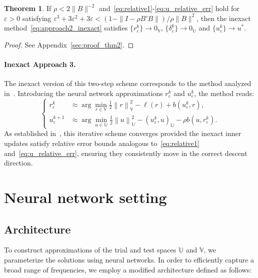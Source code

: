 \documentclass{article}
\theoremstyle{definition}
\newtheorem{theorem}{Theorem}
\begin{document}
\begin{theorem}\label{thm:approach2_inexact}
    If $\rho<2\|B\|^{-2}$ and~\eqref{eq:relative1}-\eqref{eq:u_relative_err} hold for $\varepsilon>0$ satisfying $\varepsilon^3+3\varepsilon^2+3\varepsilon< (1-\|I-\rho B'B\|)/\rho \|B\|^2$, then the inexact method~\eqref{eq:approach2_inexact} satisfies $\{r^k_\varepsilon\}\to 0_\mathbb{V}$, $\{\delta^k_\varepsilon\}\to 0_\mathbb{U}$ and $\{u^k_\varepsilon\}\to u^*$.
\end{theorem}
%
\begin{proof}
     See Appendix~\ref{sec:proof_thm2}. 
\end{proof}

\paragraph{Inexact Approach 3.}
The inexact version of this two-step scheme corresponds to the method analyzed in~\cite{BennyChackoBEV2025}. Introducing the neural network approximations $r^k_\varepsilon$ and $u^k_\varepsilon$, the method reads:
\begin{equation}\label{eq:approach3_inexact}
    \left\{
    \begin{aligned}
        r^{k}_\varepsilon &\approx  \displaystyle \arg\min_{r\in \mathbb{V}}\frac{1}{2}\left\|r\right\|^2_{\mathbb{V}} - \ell(r)  + b(u^k_\varepsilon,r), \\[2ex]
        u^{k+1}_\varepsilon &\approx  \displaystyle\arg\min_{u\in \mathbb{U}}\frac{1}{2}\left\|u\right\|^2_{\mathbb{U}} - (u^{k}_\varepsilon,u)_{\mathbb{U}} - \rho b(u,r^{k}_\varepsilon).
\end{aligned}
    \right.
\end{equation}
As established in~\cite[Theorems 3.1 and 3.2]{BennyChackoBEV2025}, this iterative scheme converges provided the inexact inner updates satisfy relative error bounds analogous to~\eqref{eq:relative1} and~\eqref{eq:u_relative_err}, ensuring they consistently move in the correct descent direction.

\section{Neural network setting}\label{sec:architecture_and_training}

\subsection{Architecture} To construct approximations of the trial and test spaces $\mathbb{U}$ and $\mathbb{V}$, we parameterize the solutions using neural networks. In order to efficiently capture a broad range of frequencies, we employ a modified architecture defined as follows:
\end{document}

